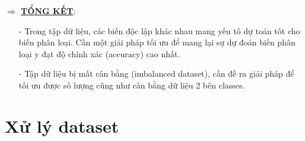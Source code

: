 \documentclass{report}
\begin{document}
            \fontsize{13}{10}\selectfont\textbf{$\Longrightarrow$ \underline{\underline{{TỔNG KẾT}}}}:
                \begin{enumerate}
                    \item [- ] Trong tập dữ liệu, các biến độc lập khác nhau mang yếu tố dự toán tốt cho biến phân loại. Cần một giải pháp tối ưu để mang lại sự dự đoán biến phân loại y đạt độ chính xác (accuracy) cao nhất.
                    \item [- ] Tập dữ liệu bị mất cân bằng (imbalanced dataset), cần đề ra giải pháp để tối ưu được số lượng cũng như cân bằng dữ liệu 2 bên classes.
                \end{enumerate}
                
    \pagebreak

    \fontsize{16}{10}\selectfont
    \section{Xử lý dataset}
\end{document}
